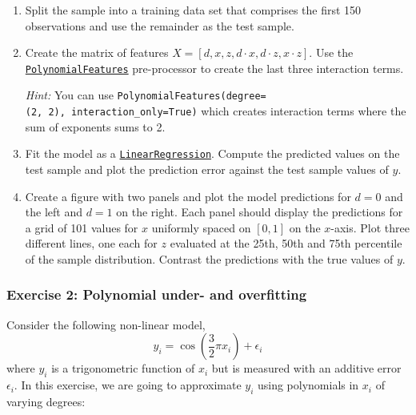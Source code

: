 \documentclass{scrartcl}
\begin{document}
\begin{enumerate}
\def\labelenumi{\arabic{enumi}.}
\item
  Split the sample into a training data set that comprises the first 150
  observations and use the remainder as the test sample.
\item
  Create the matrix of features
  \(X = [d, x, z, d\cdot x, d\cdot z, x\cdot z]\). Use the
  \href{https://scikit-learn.org/stable/modules/generated/sklearn.preprocessing.PolynomialFeatures.html}{\texttt{PolynomialFeatures}}
  pre-processor to create the last three interaction terms.

  \emph{Hint:} You can use
  \texttt{PolynomialFeatures(degree=(2,\ 2),\ interaction\_only=True)}
  which creates interaction terms where the sum of exponents sums to 2.
\item
  Fit the model as a
  \href{https://scikit-learn.org/stable/modules/generated/sklearn.linear_model.LinearRegression.html}{\texttt{LinearRegression}}.
  Compute the predicted values on the test sample and plot the
  prediction error against the test sample values of \(y\).
\item
  Create a figure with two panels and plot the model predictions for
  \(d=0\) and the left and \(d=1\) on the right. Each panel should
  display the predictions for a grid of 101 values for \(x\) uniformly
  spaced on \([0, 1]\) on the \(x\)-axis. Plot three different lines,
  one each for \(z\) evaluated at the 25th, 50th and 75th percentile of
  the sample distribution. Contrast the predictions with the true values
  of \(y\).
\end{enumerate}

    \hypertarget{exercise-2-polynomial-under--and-overfitting}{%
\subsubsection{Exercise 2: Polynomial under- and
overfitting}\label{exercise-2-polynomial-under--and-overfitting}}

Consider the following non-linear model, \[
y_i = \cos\left(\frac{3}{2} \pi x_i \right) + \epsilon_i
\] where \(y_i\) is a trigonometric function of \(x_i\) but is measured
with an additive error \(\epsilon_i\). In this exercise, we are going to
approximate \(y_i\) using polynomials in \(x_i\) of varying degrees:
\end{document}
